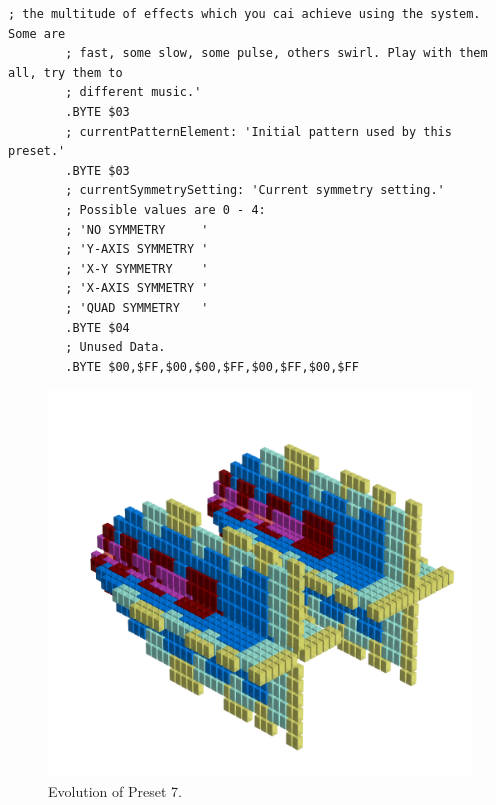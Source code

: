 \begin{lstlisting}[basicstyle=\tiny,caption=Source code for Preset 6.]
        ; the multitude of effects which you cai achieve using the system. Some are
        ; fast, some slow, some pulse, others swirl. Play with them all, try them to
        ; different music.'
        .BYTE $03
        ; currentPatternElement: 'Initial pattern used by this preset.'
        .BYTE $03
        ; currentSymmetrySetting: 'Current symmetry setting.'
        ; Possible values are 0 - 4:
        ; 'NO SYMMETRY     '
        ; 'Y-AXIS SYMMETRY '
        ; 'X-Y SYMMETRY    '
        ; 'X-AXIS SYMMETRY '
        ; 'QUAD SYMMETRY   '
        .BYTE $04
        ; Unused Data.
        .BYTE $00,$FF,$00,$00,$FF,$00,$FF,$00,$FF
\end{lstlisting}


\clearpage                                                                 
\begin{figure}[H]                                                          
    \centering                                                             
    \begin{adjustbox}{width=14cm,center}                                   
      \includegraphics[width=14cm]{src/presets/pattern7-45.png}%
    \end{adjustbox}                                                        
\caption{Evolution of Preset 7.}                                           
\end{figure}                                                               
\clearpage                                                                 
                                                                           
